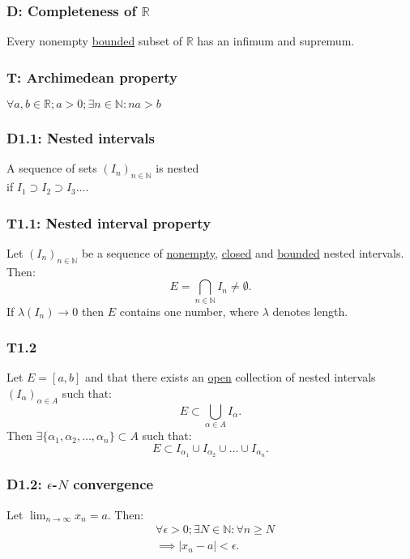 \documentclass{article}
\begin{document}
\begin{multicols*}{3}
\subsubsection*{D: Completeness of $\mathbb{R}$}
Every nonempty \underline{bounded} subset
of $\mathbb{R}$ has an infimum and supremum.

\subsubsection*{T: Archimedean property}
$\forall a,b\in\mathbb{R}; a>0;\exists n\in\mathbb{N}
: na>b$

\subsubsection*{D1.1: Nested intervals}
A sequence of sets $(I_n)_{n\in\mathbb{N}}$
is nested \\ if $I_1\supset I_2\supset I_3\dots$.

\subsubsection*{T1.1: Nested interval property}
Let $(I_n)_{n\in\mathbb{N}}$ be a sequence of
\underline{nonempty}, \underline{closed}
and \underline{bounded} nested intervals.
Then:
$$E=\bigcap_{n\in\mathbb{N}}I_n
\neq\emptyset.$$
If $\lambda(I_n)\rightarrow0$
then $E$ contains one number,
where $\lambda$ denotes length.

\subsubsection*{T1.2}
Let $E=[a,b]$ and that there exists an \underline{open}
collection of nested intervals
$(I_{\alpha})_{\alpha\in A}$ such that:
$$E\subset\bigcup_{\alpha\in A}I_{\alpha}.$$
Then $\exists\{\alpha_1,\alpha_2,\dots,\alpha_n\}
\subset A$ such that:
$$E\subset I_{\alpha_1}\cup I_{\alpha_2}\cup
\dots\cup I_{\alpha_n}.$$

\subsubsection*{D1.2: $\epsilon$-$N$ convergence}
Let $\displaystyle\lim_{n\rightarrow\infty}x_n=a$. Then:
\begin{align*}
    &\forall\epsilon>0; \exists N\in\mathbb{N}:
    \forall n\geq N \\
    &\implies |x_n-a|<\epsilon.
\end{align*}


\end{multicols*}
\end{document}
